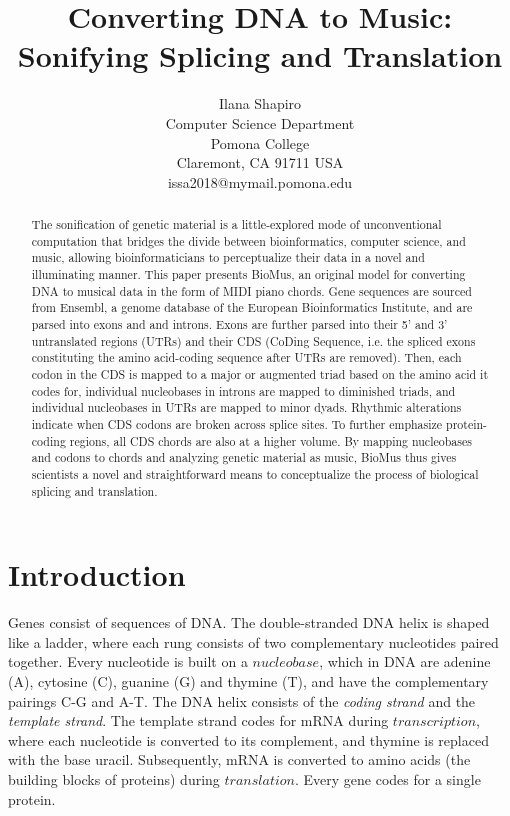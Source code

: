 \documentclass[letterpaper]{article}
\title{Converting DNA to Music: Sonifying Splicing and Translation}
\author{Ilana Shapiro\\
Computer Science Department\\
Pomona College\\
Claremont, CA 91711 USA\\
issa2018@mymail.pomona.edu\\
}
\begin{document}
 
\maketitle
\begin{abstract}
The sonification of genetic material is a little-explored mode of unconventional computation that bridges the divide between bioinformatics, computer science, and music, allowing bioinformaticians to perceptualize their data in a novel and illuminating manner. This paper presents BioMus, an original model for converting DNA to musical data in the form of MIDI piano chords. Gene sequences are sourced from Ensembl, a genome database of the European Bioinformatics Institute, and are parsed into exons and and introns. Exons are further parsed into their 5' and 3' untranslated regions (UTRs) and their CDS (CoDing Sequence, i.e. the spliced exons constituting the amino acid-coding sequence after UTRs are removed). Then, each codon in the CDS is mapped to a major or augmented triad based on the amino acid it codes for, individual nucleobases in introns are mapped to diminished triads, and individual nucleobases in UTRs are mapped to minor dyads. Rhythmic alterations indicate when CDS codons are broken across splice sites. To further emphasize protein-coding regions, all CDS chords are also at a higher volume. By mapping nucleobases and codons to chords and analyzing genetic material as music, BioMus thus gives scientists a novel and straightforward means to conceptualize the process of biological splicing and translation.
\end{abstract}

\section{Introduction}
Genes consist of sequences of DNA. The double-stranded DNA helix is shaped like a ladder, where each rung consists of two complementary nucleotides paired together. Every nucleotide is built on a $nucleobase$, which in DNA are adenine (A), cytosine (C), guanine (G) and thymine (T), and have the complementary pairings C-G and A-T. The DNA helix consists of the \textit{coding strand} and the \textit{template strand}. The template strand codes for mRNA during $transcription$, where each nucleotide is converted to its complement, and thymine is replaced with the base uracil.%
Subsequently, mRNA is converted to amino acids (the building blocks of proteins) during $translation$. Every gene codes for a single protein.
\end{document}
